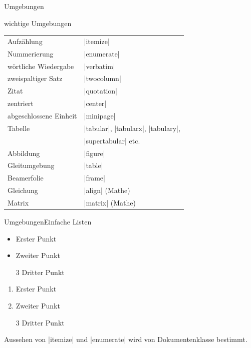 \documentclass[
	vorläufig=true,
	datum=2016-10-28,
	titel={Allgemeine Formatierung und Pakete},
	web=false,
]{../tex/latexkurs-slides}
\begin{document}
\begin{frame}[fragile]{Umgebungen}
\begin{block}{wichtige Umgebungen}
\begin{tabular}{ll}
Aufzählung & |itemize| \\
Nummerierung & |enumerate| \\
wörtliche Wiedergabe & |verbatim| \\
zweispaltiger Satz & |twocolumn|\\
Zitat & |quotation| \\
zentriert & |center|\\
abgeschlossene Einheit & |minipage|\\
Tabelle & |tabular|, |tabularx|, |tabulary|,\\
         & |supertabular| etc. \\
Abbildung & |figure| \\
Gleitumgebung & |table| \\
Beamerfolie & |frame| \\
Gleichung & |align| (Mathe)\\
Matrix & |matrix| (Mathe)\\
\end{tabular}
\end{block}
\end{frame}

\begin{frame}[fragile]{Umgebungen}{Einfache Listen}
\begin{LTXexample}
\begin{itemize}
  \item Erster Punkt
  \item Zweiter Punkt
  \item[3] Dritter Punkt
\end{itemize}
\end{LTXexample}
\begin{LTXexample}
\begin{enumerate}
  \item Erster Punkt
  \item Zweiter Punkt
  \item[3] Dritter Punkt
\end{enumerate}
\end{LTXexample}
Aussehen von |itemize| und |enumerate| wird von Dokumentenklasse bestimmt.
\end{frame}
\end{document}
